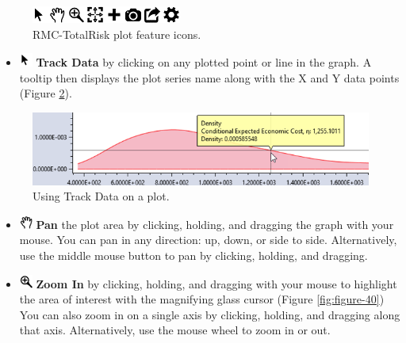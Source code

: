 \documentclass[
]{book}
\providecommand{\tightlist}{%
  \setlength{\itemsep}{0pt}\setlength{\parskip}{0pt}}
\begin{document}
\begin{figure}

{\centering \includegraphics{images/figure38} 

}

\caption{RMC-TotalRisk plot feature icons.}\label{fig:figure-38}
\end{figure}

\begin{itemize}
\tightlist
\item
  \includegraphics{images/trackdata.png} \textbf{Track Data} by clicking on any plotted point or line in the graph. A tooltip then displays the plot series name along with the X and Y data points (Figure \ref{fig:figure-39}).
\end{itemize}

\begin{figure}

{\centering \includegraphics{images/figure39} 

}

\caption{Using Track Data on a plot.}\label{fig:figure-39}
\end{figure}

\begin{itemize}
\item
  \includegraphics{images/pan.png} \textbf{Pan} the plot area by clicking, holding, and dragging the graph with your mouse. You can pan in any direction: up, down, or side to side. Alternatively, use the middle mouse button to pan by clicking, holding, and dragging.
\item
  \includegraphics{images/zoomin.png} \textbf{Zoom In} by clicking, holding, and dragging with your mouse to highlight the area of interest with the magnifying glass cursor (Figure \ref{fig:figure-40}) You can also zoom in on a single axis by clicking, holding, and dragging along that axis. Alternatively, use the mouse wheel to zoom in or out.
\end{itemize}
\end{document}
